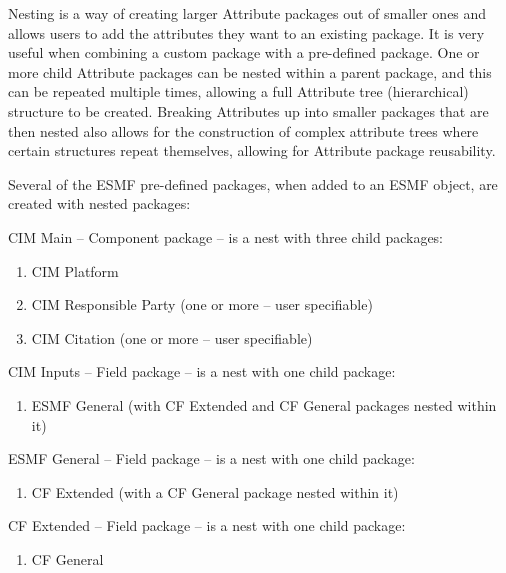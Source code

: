 %


\label{sec:AttPackNesting}


Nesting is a way of creating larger Attribute packages out of smaller ones and allows users to add the attributes they want to an existing package. It is very useful when combining a custom package with a pre-defined package. One or more child Attribute packages can be nested within a parent package, and this can be repeated multiple times, allowing a full Attribute tree (hierarchical) structure to be created.  Breaking Attributes up into smaller packages that are then nested also allows for the construction of complex attribute trees where certain structures repeat themselves, allowing for Attribute package reusability.


Several of the ESMF pre-defined packages, when added to an ESMF object, are created with nested packages:

CIM Main -- Component package -- is a nest with three child packages:
\begin{enumerate}
   \item CIM Platform
   \item CIM Responsible Party (one or more -- user specifiable)
   \item CIM Citation (one or more -- user specifiable)
\end{enumerate}

CIM Inputs -- Field package -- is a nest with one child package:
\begin{enumerate}
   \item ESMF General (with CF Extended and CF General packages nested within it)
\end{enumerate}

ESMF General -- Field package -- is a nest with one child package:
\begin{enumerate}
   \item CF Extended (with a CF General package nested within it)
\end{enumerate}

CF Extended -- Field package -- is a nest with one child package:
\begin{enumerate}
   \item CF General
\end{enumerate}


